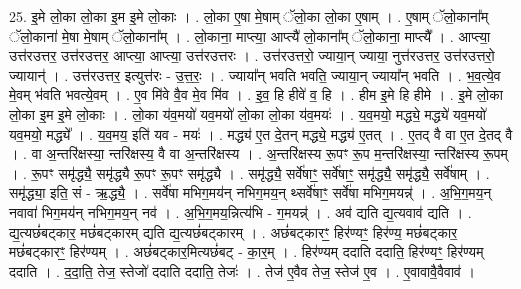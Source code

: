 \documentclass[17pt]{extarticle}
\begin{document}
25. इ॒मे लो॒का लो॒का इ॒म इ॒मे लो॒काः । . लो॒का ए॒षा मे॒षाम् ॅलो॒का लो॒का ए॒षाम् । . ए॒षाम् ॅलो॒काना᳚म् ॅलो॒काना॑ मे॒षा मे॒षाम् ॅलो॒काना᳚म् । . लो॒काना॒ माप्त्या॒ आप्त्यै॑ लो॒काना᳚म् ॅलो॒काना॒ माप्त्यै᳚ । . आप्त्या॒ उत्त॑र‍उत्तर॒ उत्त॑र‍उत्तर॒ आप्त्या॒ आप्त्या॒ उत्त॑र‍उत्तरः । . उत्त॑र‍उत्तरो॒ ज्याया॒न् ज्याया॒ नुत्त॑र‍उत्तर॒ उत्त॑र‍उत्तरो॒ ज्यायान्॑ । . उत्त॑र‌उत्तर॒ इत्युत्त॑रः - उ॒त्त॒रः॒ । . ज्याया᳚न् भवति भवति॒ ज्याया॒न् ज्याया᳚न् भवति । . भ॒व॒त्ये॒व मे॒वम् भ॑वति भवत्ये॒वम् । . ए॒व मि॑वे वै॒व मे॒व मि॑व । . इ॒व॒ हि हीवे॑ व॒ हि । . हीम इ॒मे हि हीमे । . इ॒मे लो॒का लो॒का इ॒म इ॒मे लो॒काः । . लो॒का य॑व॒मयो॑ यव॒मयो॑ लो॒का लो॒का य॑व॒मयः॑ । . य॒व॒मयो॒ मद्ध्ये॒ मद्ध्ये॑ यव॒मयो॑ यव॒मयो॒ मद्ध्ये᳚ । . य॒व॒मय॒ इति॑ यव - मयः॑ । . मद्ध्य॑ ए॒त दे॒तन् मद्ध्ये॒ मद्ध्य॑ ए॒तत् । . ए॒तद् वै वा ए॒त दे॒तद् वै । . वा अ॒न्तरि॑क्षस्या॒ न्तरि॑क्षस्य॒ वै वा अ॒न्तरि॑क्षस्य । . अ॒न्तरि॑क्षस्य रू॒पꣳ रू॒प म॒न्तरि॑क्षस्या॒ न्तरि॑क्षस्य रू॒पम् । . रू॒पꣳ समृ॑द्ध्यै॒ समृ॑द्ध्यै रू॒पꣳ रू॒पꣳ समृ॑द्ध्यै । . समृ॑द्ध्यै॒ सर्वे॑षाꣳ॒॒ सर्वे॑षाꣳ॒॒ समृ॑द्ध्यै॒ समृ॑द्ध्यै॒ सर्वे॑षाम् । . समृ॑द्ध्या॒ इति॒ सं - ऋ॒द्ध्यै॒ । . सर्वे॑षा मभिग॒मय॑न् नभिग॒मय॒न् थ्सर्वे॑षाꣳ॒॒ सर्वे॑षा मभिग॒मयन्न्॑ । . अ॒भि॒ग॒मय॒न् नवावा॑ भिग॒मय॑न् नभिग॒मय॒न् नव॑ । . अ॒भि॒ग॒मय॒न्नित्य॑भि - ग॒मयन्न्॑ । . अव॑ द्यति द्य॒त्यवाव॑ द्यति । . द्य॒त्यछं॑बट्कार॒ मछं॑बट्कारम् द्यति द्य॒त्यछं॑बट्कारम् । . अछं॑बट्कारꣳ॒॒ हिर॑ण्यꣳ॒॒ हिर॑ण्य॒ मछं॑बट्कार॒ मछं॑बट्कारꣳ॒॒ हिर॑ण्यम् । . अछं॑बट्कार॒मित्यछं॑बट् - का॒र॒म् । . हिर॑ण्यम् ददाति ददाति॒ हिर॑ण्यꣳ॒॒ हिर॑ण्यम् ददाति । . द॒दा॒ति॒ तेज॒ स्तेजो॑ ददाति ददाति॒ तेजः॑ । . तेज॑ ए॒वैव तेज॒ स्तेज॑ ए॒व । . ए॒वावावै॒वैवाव॑ । \newline
\end{document}
